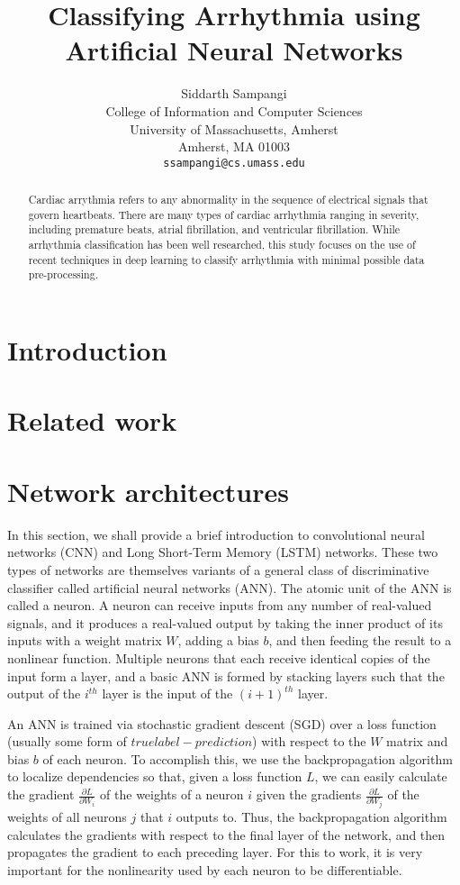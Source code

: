 \documentclass{article} %
\title{Classifying Arrhythmia using Artificial Neural Networks}
\author{
Siddarth Sampangi \\
College of Information and Computer Sciences\\
University of Massachusetts, Amherst\\
Amherst, MA 01003 \\
\texttt{ssampangi@cs.umass.edu} \\
}
\begin{document}
\maketitle

\begin{abstract}
Cardiac arrythmia refers to any abnormality in the sequence of electrical signals that govern heartbeats. There are many types of cardiac arrhythmia ranging in severity, including premature beats, atrial fibrillation, and ventricular fibrillation. While arrhythmia classification has been well researched, this study focuses on the use of recent techniques in deep learning to classify arrhythmia with minimal possible data pre-processing. 
\end{abstract}

\section{Introduction}

\section{Related work}

\section{Network architectures}
In this section, we shall provide a brief introduction to convolutional neural networks (CNN) and Long Short-Term Memory (LSTM) networks. These two types of networks are themselves variants of a general class of discriminative classifier called artificial neural networks (ANN). The atomic unit of the ANN is called a neuron. A neuron can receive inputs from any number of real-valued signals, and it produces a real-valued output by taking the inner product of its inputs with a weight matrix $W$, adding a bias $b$, and then feeding the result to a nonlinear function. Multiple neurons that each receive identical copies of the input form a layer, and a basic ANN is formed by stacking layers such that the output of the $i^{th}$ layer is the input of the $(i+1)^{th}$ layer. 

An ANN is trained via stochastic gradient descent (SGD) over a loss function (usually some form of $true label - prediction$) with respect to the $W$ matrix and bias $b$ of each neuron. To accomplish this, we use the backpropagation algorithm to localize dependencies so that, given a loss function $L$, we can easily calculate the gradient $\frac{\partial L}{\partial W_{i}}$ of the weights of a neuron $i$ given the gradients $\frac{\partial L}{\partial W_{j}}$ of the weights of all neurons $j$ that $i$ outputs to. Thus, the backpropagation algorithm calculates the gradients with respect to the final layer of the network, and then propagates the gradient to each preceding layer. For this to work, it is very important for the nonlinearity used by each neuron to be differentiable. 
\end{document}
